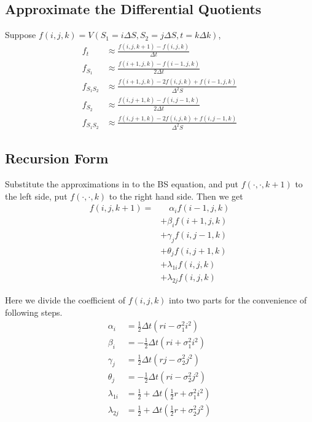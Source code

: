 \subsection{Approximate the Differential Quotients}
Suppose $f(i, j, k) = V(S_1=i\Delta S, S_2=j\Delta S, t=k\Delta k)$,
\[
    \begin{aligned}
        f_t &\approx \frac{f(i, j, k+1) - f(i, j, k)}{\Delta t} \\
        f_{S_1} &\approx \frac{f(i+1, j, k) - f(i-1, j, k)}{2\Delta t} \\
        f_{S_1S_2} &\approx \frac{f(i+1, j, k) - 2f(i, j, k) + f(i-1, j, k)}{\Delta^2S} \\
        f_{S_2} &\approx \frac{f(i, j+1, k) - f(i, j-1, k)}{2\Delta t} \\
        f_{S_1S_2} &\approx \frac{f(i, j+1, k) - 2f(i, j, k) + f(i, j-1, k)}{\Delta^2S}
    \end{aligned}
\]


\subsection{Recursion Form}
Substitute the approximations in to the BS equation, and put $f(\cdot, \cdot, k+1)$ to the left side, put $f(\cdot, \cdot, k)$ to the right hand side. Then we get
\[
    \begin{aligned}
        f(i, j, k+1) =& \quad\alpha_i f(i-1, j, k) \\
        &+ \beta_i f(i+1, j, k) \\
        &+ \gamma_j f(i, j-1, k) \\
        &+ \theta_j f(i, j+1, k) \\
        &+ \lambda_{1i} f(i, j, k) \\
        &+ \lambda_{2j} f(i, j, k)
    \end{aligned}
\]

Here we divide the coefficient of $f(i, j, k)$ into two parts for the convenience of following steps.
\[
    \begin{aligned}
        \alpha_i &= \frac{1}{2}\Delta t(ri-\sigma_1^2i^2) \\
        \beta_i &= -\frac{1}{2}\Delta t(ri+\sigma_1^2i^2) \\
        \gamma_j &= \frac{1}{2}\Delta t(rj-\sigma_2^2j^2) \\
        \theta_j &= -\frac{1}{2}\Delta t(ri-\sigma_2^2j^2) \\
        \lambda_{1i} &= \frac{1}{2} + \Delta t(\frac{1}{2}r+\sigma_1^2i^2) \\
        \lambda_{2j} &= \frac{1}{2} + \Delta t(\frac{1}{2}r+\sigma_2^2j^2) \\
    \end{aligned}
\]


